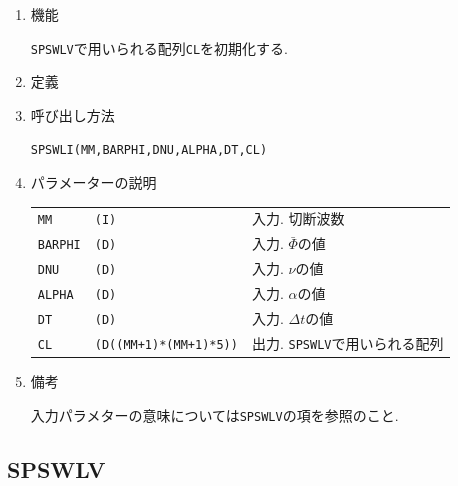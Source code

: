 \documentclass[a4j,fleqn]{jarticle}
\begin{document}
\begin{enumerate}

\item 機能

 {\tt SPSWLV}で用いられる配列{\tt CL}を初期化する.

\item 定義

\item 呼び出し方法 

{\tt SPSWLI(MM,BARPHI,DNU,ALPHA,DT,CL)}

\item パラメーターの説明

\begin{tabular}{lll}
{\tt MM} & {\tt (I)} & 入力. 切断波数\\
{\tt BARPHI} & {\tt (D)} 
& 入力. $\bar\Phi$の値\\
{\tt DNU} & {\tt (D)} 
& 入力. $\nu$の値\\
{\tt ALPHA} & {\tt (D)} 
& 入力. $\alpha$の値\\
{\tt DT} & {\tt (D)} 
& 入力. $\Delta t$の値\\
{\tt CL}  & {\tt (D((MM+1)*(MM+1)*5))}
             & 出力. {\tt SPSWLV}で用いられる配列
\end{tabular}

\item 備考

入力パラメターの意味については{\tt SPSWLV}の項を参照のこと.

\end{enumerate}


\subsection{SPSWLV}
\end{document}
